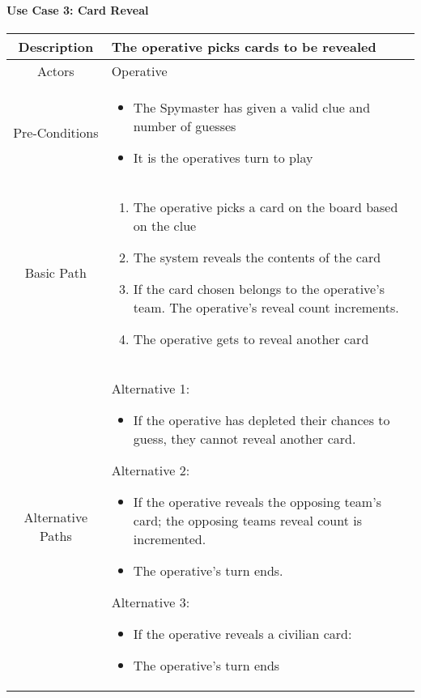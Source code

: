 \documentclass[10pt, a4paper]{article}
\begin{document}
		\paragraph{Use Case 3: Card Reveal}
		\begin{center}
			\begin{tabular}{ |c|p{7cm}| } 
				\hline
				Description & The operative picks cards to be revealed\\ 
				\hline
				Actors & Operative  \\
				\hline 
				Pre-Conditions & \begin{itemize}	
					\item The Spymaster has given a valid clue and number of guesses 
					\item It is the operatives turn to play
				\end{itemize}	
				  \\
				\hline
				Basic Path & 
				\begin{enumerate}
					\item The operative picks a card on the board based on the clue
					\item The system reveals the contents of the card  
					\item If the card chosen belongs to the operative’s team. The operative’s reveal count increments.
					\item The operative gets to reveal another card 
				\end{enumerate} \\
				\hline 
				Alternative Paths & Alternative 1: \begin{itemize}
					\item If the operative has depleted their chances to guess, they cannot reveal another card.
				\end{itemize}
				
				Alternative 2:
				\begin{itemize}
					\item If the operative reveals the opposing team’s card; the opposing teams reveal count is incremented.
					\item The operative’s turn ends.  
				\end{itemize}
			
			Alternative 3:
			\begin{itemize}
				\item If the operative reveals a civilian card: 
				\item The operative’s turn ends   
			\end{itemize}
		

\end{tabular}
\end{center}
\end{document}
